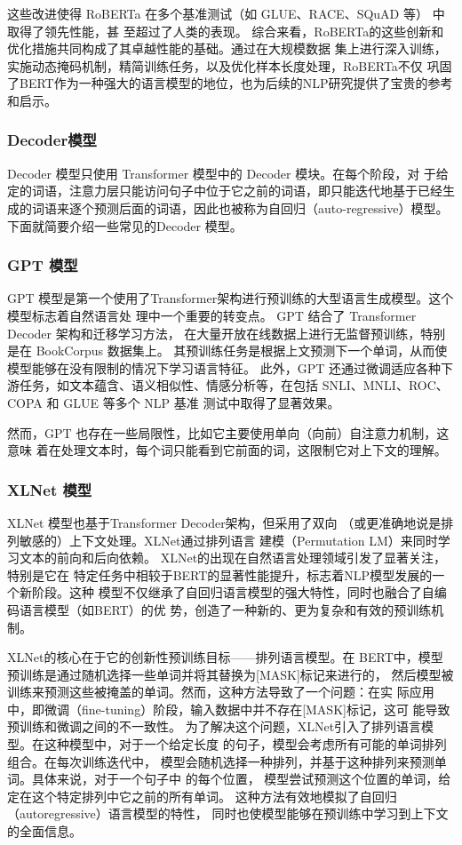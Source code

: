 这些改进使得 RoBERTa 在多个基准测试（如 GLUE、RACE\cite{lai2017race}、SQuAD 等）
中取得了领先性能，甚
至超过了人类的表现。
综合来看，RoBERTa的这些创新和优化措施共同构成了其卓越性能的基础。通过在大规模数据
集上进行深入训练，实施动态掩码机制，精简训练任务，以及优化样本长度处理，RoBERTa不仅
巩固了BERT作为一种强大的语言模型的地位，也为后续的NLP研究提供了宝贵的参考和启示。


\subsubsection*{Decoder模型}
Decoder 模型只使用 Transformer 模型中的 Decoder 模块。在每个阶段，对
于给定的词语，注意力层只能访问句子中位于它之前的词语，即只能迭代地基于已经生
成的词语来逐个预测后面的词语，因此也被称为自回归（auto-regressive）模型。
下面就简要介绍一些常见的Decoder 模型。

\subsubsection*{GPT 模型}
GPT 模型是第一个使用了Transformer架构进行预训练的大型语言生成模型。这个模型标志着自然语言处
理中一个重要的转变点。
GPT 结合了 Transformer Decoder 架构和迁移学习方法，
在大量开放在线数据上进行无监督预训练，特别是在 BookCorpus 数据集上。
其预训练任务是根据上文预测下一个单词，从而使模型能够在没有限制的情况下学习语言特征。
此外，GPT 还通过微调适应各种下游任务，如文本蕴含、语义相似性、情感分析等，在包括
SNLI、MNLI、ROC、COPA 和 GLUE 等多个 NLP 基准
测试中取得了显著效果。

然而，GPT 也存在一些局限性，比如它主要使用单向（向前）自注意力机制，这意味
着在处理文本时，每个词只能看到它前面的词，这限制它对上下文的理解。

\subsubsection*{XLNet 模型}
XLNet 模型也基于Transformer Decoder架构，但采用了双向
（或更准确地说是排列敏感的）上下文处理。XLNet通过排列语言
建模（Permutation LM）来同时学习文本的前向和后向依赖。
XLNet的出现在自然语言处理领域引发了显著关注，特别是它在
特定任务中相较于BERT的显著性能提升，标志着NLP模型发展的一个新阶段。这种
模型不仅继承了自回归语言模型的强大特性，同时也融合了自编码语言模型（如BERT）的优
势，创造了一种新的、更为复杂和有效的预训练机制。

XLNet的核心在于它的创新性预训练目标——排列语言模型。在
BERT中，模型预训练是通过随机选择一些单词并将其替换为[MASK]标记来进行的，
然后模型被训练来预测这些被掩盖的单词。然而，这种方法导致了一个问题：在实
际应用中，即微调（fine-tuning）阶段，输入数据中并不存在[MASK]标记，这可
能导致预训练和微调之间的不一致性。
为了解决这个问题，XLNet引入了排列语言模型。在这种模型中，对于一个给定长度
的句子，模型会考虑所有可能的单词排列组合。在每次训练迭代中，
模型会随机选择一种排列，并基于这种排列来预测单词。具体来说，对于一个句子中
的每个位置，
模型尝试预测这个位置的单词，给定在这个特定排列中它之前的所有单词。
这种方法有效地模拟了自回归（autoregressive）语言模型的特性，
同时也使模型能够在预训练中学习到上下文的全面信息。

